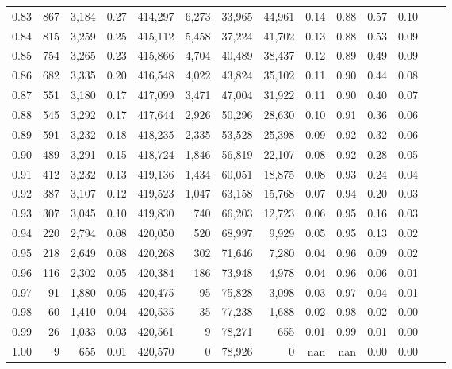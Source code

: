 \begin{tabular}{rrrrrrrrrrrrrr}
0.83 &    867 &  3,184 &     0.27 &  414,297 &    6,273 &  33,965 &  44,961 &  0.14 &  0.88 &  0.57 &      0.10 \\
0.84 &    815 &  3,259 &     0.25 &  415,112 &    5,458 &  37,224 &  41,702 &  0.13 &  0.88 &  0.53 &      0.09 \\
0.85 &    754 &  3,265 &     0.23 &  415,866 &    4,704 &  40,489 &  38,437 &  0.12 &  0.89 &  0.49 &      0.09 \\
0.86 &    682 &  3,335 &     0.20 &  416,548 &    4,022 &  43,824 &  35,102 &  0.11 &  0.90 &  0.44 &      0.08 \\
0.87 &    551 &  3,180 &     0.17 &  417,099 &    3,471 &  47,004 &  31,922 &  0.11 &  0.90 &  0.40 &      0.07 \\
0.88 &    545 &  3,292 &     0.17 &  417,644 &    2,926 &  50,296 &  28,630 &  0.10 &  0.91 &  0.36 &      0.06 \\
0.89 &    591 &  3,232 &     0.18 &  418,235 &    2,335 &  53,528 &  25,398 &  0.09 &  0.92 &  0.32 &      0.06 \\
0.90 &    489 &  3,291 &     0.15 &  418,724 &    1,846 &  56,819 &  22,107 &  0.08 &  0.92 &  0.28 &      0.05 \\
0.91 &    412 &  3,232 &     0.13 &  419,136 &    1,434 &  60,051 &  18,875 &  0.08 &  0.93 &  0.24 &      0.04 \\
0.92 &    387 &  3,107 &     0.12 &  419,523 &    1,047 &  63,158 &  15,768 &  0.07 &  0.94 &  0.20 &      0.03 \\
0.93 &    307 &  3,045 &     0.10 &  419,830 &      740 &  66,203 &  12,723 &  0.06 &  0.95 &  0.16 &      0.03 \\
0.94 &    220 &  2,794 &     0.08 &  420,050 &      520 &  68,997 &   9,929 &  0.05 &  0.95 &  0.13 &      0.02 \\
0.95 &    218 &  2,649 &     0.08 &  420,268 &      302 &  71,646 &   7,280 &  0.04 &  0.96 &  0.09 &      0.02 \\
0.96 &    116 &  2,302 &     0.05 &  420,384 &      186 &  73,948 &   4,978 &  0.04 &  0.96 &  0.06 &      0.01 \\
0.97 &     91 &  1,880 &     0.05 &  420,475 &       95 &  75,828 &   3,098 &  0.03 &  0.97 &  0.04 &      0.01 \\
0.98 &     60 &  1,410 &     0.04 &  420,535 &       35 &  77,238 &   1,688 &  0.02 &  0.98 &  0.02 &      0.00 \\
0.99 &     26 &  1,033 &     0.03 &  420,561 &        9 &  78,271 &     655 &  0.01 &  0.99 &  0.01 &      0.00 \\
1.00 &      9 &    655 &     0.01 &  420,570 &        0 &  78,926 &       0 &   nan &   nan &  0.00 &      0.00 \\
\bottomrule
\end{tabular}
